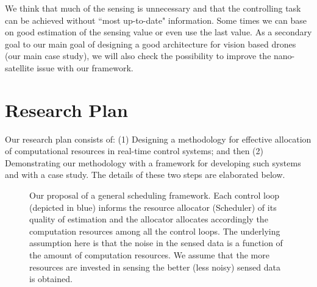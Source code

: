 \documentclass[11pt]{article}
\begin{document}
We think that much of the sensing is unnecessary and that the controlling task can be achieved without ``most up-to-date" information. Some times we can base on good estimation of the sensing value or even use the last value. As a secondary goal to our main goal of designing a good architecture for vision based drones (our main case study), we will also check the possibility to improve the nano-satellite issue with our framework.

\section{Research Plan}
\label{sec:Research Plan}

Our research plan consists of: (1) Designing a methodology for effective allocation of computational resources in real-time control systems; and then (2) Demonstrating our methodology with a framework for developing such systems and with a case study. The details of these two steps are elaborated below.


\begin{figure}[]
    \centering
    
    
    \caption{Our proposal of a general scheduling framework. Each control loop (depicted in blue) informs the resource allocator (Scheduler) of its quality of estimation and the allocator allocates accordingly the computation resources among all the control loops. The underlying assumption here is that the noise in the sensed data is a function of the amount of computation resources. We assume that the more resources are invested in sensing the better (less noisy) sensed data is obtained.
    \label{fig:general_hybrid_loop}}
\end{figure}
\end{document}
